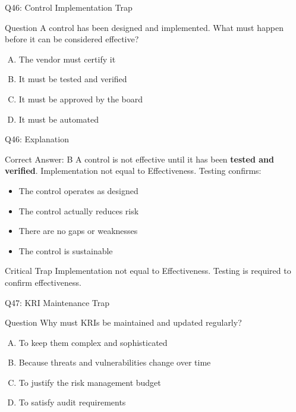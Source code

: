 \documentclass{beamer}
\begin{document}
	\begin{frame}{Q46: Control Implementation Trap}
		\begin{block}{Question}
			A control has been designed and implemented. What must happen before it can be considered effective?
		\end{block}
		\begin{enumerate}[(A)]
			\item The vendor must certify it
			\item It must be tested and verified
			\item It must be approved by the board
			\item It must be automated
		\end{enumerate}
	\end{frame}
	
	\begin{frame}{Q46: Explanation}
		\begin{block}{Correct Answer: B}
			A control is not effective until it has been \textbf{tested and verified}. Implementation not equal to Effectiveness. Testing confirms:
			\begin{itemize}
				\item The control operates as designed
				\item The control actually reduces risk
				\item There are no gaps or weaknesses
				\item The control is sustainable
			\end{itemize}
		\end{block}
		\begin{alertblock}{Critical Trap}
			Implementation not equal to Effectiveness.
			Testing is required to confirm effectiveness.
		\end{alertblock}
	\end{frame}
	
	\begin{frame}{Q47: KRI Maintenance Trap}
		\begin{block}{Question}
			Why must KRIs be maintained and updated regularly?
		\end{block}
		\begin{enumerate}[(A)]
			\item To keep them complex and sophisticated
			\item Because threats and vulnerabilities change over time
			\item To justify the risk management budget
			\item To satisfy audit requirements
		\end{enumerate}
	\end{frame}
	
\end{document}
